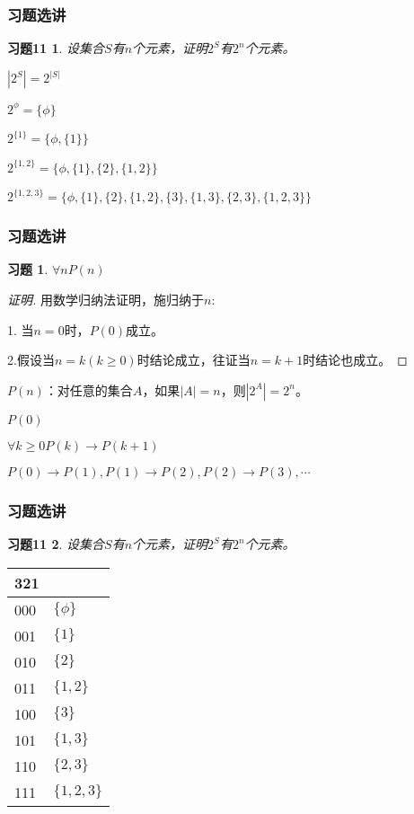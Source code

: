 \documentclass{beamer}
\begin{document}
\begin{CJK*}{UTF8}{gbsn}
\newtheorem*{Exercise11}{习题11}
\begin{frame}
  \frametitle{习题选讲}
  \begin{Exercise11}
    设集合$S$有$n$个元素，证明$2^S$有$2^n$个元素。
  \end{Exercise11}

  $|2^S|=2^{|S|}$

  $2^{\phi} = \{\phi\}$

  $2^{\{1\}} = \{\phi, \{1\}\}$

  $2^{\{1,2\}} = \{\phi, \{1\}, \{2\}, \{1,2\}\}$

  $2^{\{1,2,3\}} = \{\phi, \{1\}, \{2\}, \{1,2\}, \{3\}, \{1,3\}, \{2,3\}, \{1,2,3\}\}$
\end{frame}

\newtheorem*{Exercise0}{习题}
\begin{frame}
  \frametitle{习题选讲}
  \begin{Exercise0}
    $\forall n P(n)$
  \end{Exercise0}

  \begin{proof}[证明]
    用数学归纳法证明，施归纳于$n$:

   1. 当$n=0$时，$P(0)$成立。

   2.假设当$n=k(k\geq 0)$时结论成立，往证当$n=k+1$时结论也成立。
    
 \end{proof}

 $P(n)$：对任意的集合$A$，如果$|A|=n$，则$|2^A|=2^n$。

 $P(0)$

 $\forall k\geq 0 P(k) \to P(k+1)$

 $P(0)\to P(1), P(1)\to P(2), P(2)\to P(3), \cdots$
 
\end{frame}


\begin{frame}
  \frametitle{习题选讲}
  \begin{Exercise11}
    设集合$S$有$n$个元素，证明$2^S$有$2^n$个元素。
  \end{Exercise11}

  \begin{tabular}{l|l}
    321&\\
    \hline
    000&$\{\phi\}$\\
    001&$\{1\}$\\
    010&$\{2\}$\\
    011&$\{1,2\}$\\
    100&$\{3\}$\\
    101&$\{1,3\}$\\
    110&$\{2,3\}$\\
    111&$\{1,2,3\}$
  \end{tabular}
\end{frame}


  
\end{CJK*}
\end{document}
